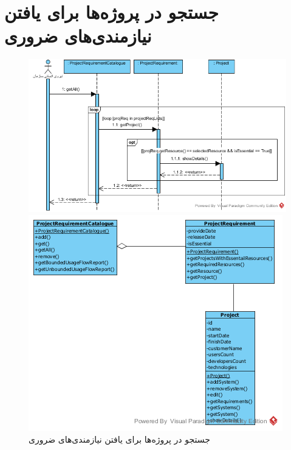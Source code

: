 \section{جستجو در پروژه‌ها برای یافتن نیازمندی‌های ضروری}
\begin{figure}[H]
	\centering
	\includegraphics[scale=0.8]{img/sequence-analysis/SearchForEssentialRequirements}
	
	
	\includegraphics[scale=0.8]{img/sequence-analysis/SearchForEssentialRequirementsC}
	\caption{جستجو در پروژه‌ها برای یافتن نیازمندی‌های ضروری}
\end{figure}


